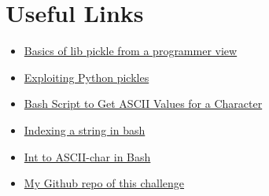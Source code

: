 \documentclass{article}
\begin{document}
\section{Useful Links}
\begin{itemize}
    \item \href{https://www.geeksforgeeks.org/understanding-python-pickling-example/}{Basics of lib pickle from a programmer view}
    \item \href{https://davidhamann.de/2020/04/05/exploiting-python-pickle/}{Exploiting Python pickles}
    \item \href{https://www.baeldung.com/linux/shell-ascii-value-character}{Bash Script to Get ASCII Values for a Character}
    \item \href{https://unix.stackexchange.com/questions/303960/index-a-string-in-bash}{Indexing a string in bash}
    \item  \href{https://stackoverflow.com/questions/890262/integer-ascii-value-to-character-in-bash-using-printf}{Int to ASCII-char in Bash}
    \item \href{https://github.com/FabianRapp/CTF_web_jarred}{My Github repo of this challenge}
\end{itemize}
\end{document}
